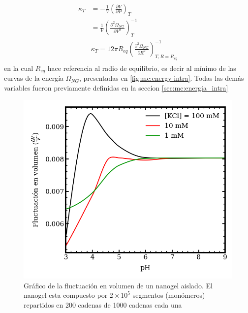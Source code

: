 	
	\begin{align}
		\begin{aligned}
			\kappa_T & = -\frac{1}{V} \left( \frac{\partial V}{\partial P}\right)_T \\
			& =\frac{1}{V} \left( \frac{\partial^2 \Omega_{NG}}{\partial V^2}\right)^{-1}_T \\
			& \kappa_T  = 12 \pi R_{eq} \left( \frac{\partial^2 \Omega_{NG}}{\partial R^2}\right)^{-1}_{T,R=R_{eq}}
		\end{aligned}
	\end{align}
	\noindent en la cual $R_{eq}$ hace referencia al radio de equilibrio, es decir al m\'inimo de las curvas de la energ\'ia $ \Omega_{NG}$, presentadas en \ref{fig:mc:energy-intra}. Todas las dem\'as variables fueron previamente definidas en la secc\'ion \ref{sec:mc:energia_intra}
	
	\begin{figure}
		\centering
		\includegraphics[width=0.45\linewidth]{Figures/graph-mc/fluct-pH.png}
		\caption{Gr\'afico de la fluctuaci\'on en volumen de un nanogel aislado. El nanogel esta compuesto por $2\times 10^5$ segmentos (mon\'omeros) repartidos en 200 cadenas de 1000 cadenas cada una}
		\label{fig:mc:flut-pH}
	\end{figure}
	
